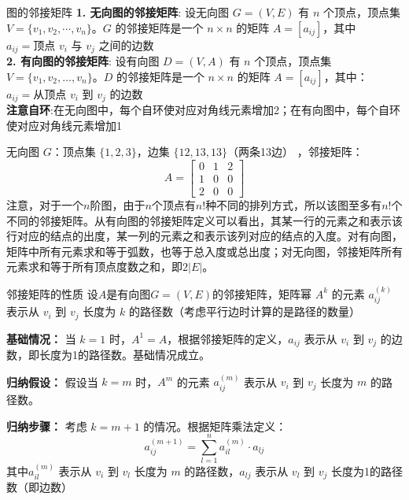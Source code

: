 \documentclass[lang=cn,11pt]{elegantbook}
\begin{document}
\begin{definition}{图的邻接矩阵}
\textbf{1. 无向图的邻接矩阵}:
设无向图 $G = (V, E)$ 有 $n$ 个顶点，顶点集 $V = \{v_1, v_2, \cdots, v_n\}$。$G$ 的邻接矩阵是一个 $n \times n$ 的矩阵 $A = [a_{ij}]$，其中$a_{ij} = \text{顶点 } v_i \text{ 与 } v_j \text{ 之间的边数}$\\
\textbf{2. 有向图的邻接矩阵}:
设有向图 $D = (V, A)$ 有 $n$ 个顶点，顶点集 $V = \{v_1, v_2, \ldots, v_n\}$。$D$ 的邻接矩阵是一个 $n \times n$ 的矩阵 $A = [a_{ij}]$，其中：$a_{ij} = \text{从顶点 } v_i \text{ 到 } v_j \text{ 的边数}$\\
\textbf{注意自环}:在无向图中，每个自环使对应对角线元素增加2；在有向图中，每个自环使对应对角线元素增加1
\end{definition}
无向图 $G$：顶点集 $\{1,2,3\}$，边集 $\{12, 13, 13\}$（两条13边） ，邻接矩阵：\[
A = \begin{bmatrix}
0 & 1 & 2 \\
1 & 0 & 0 \\
2 & 0 & 0
\end{bmatrix}\]
注意，对于一个$n$阶图，由于$n$个顶点有$n!$种不同的排列方式，所以该图至多有$n!$个不同的邻接矩阵。从有向图的邻接矩阵定义可以看出，其某一行的元素之和表示该行对应的结点的出度，某一列的元素之和表示该列对应的结点的入度。对有向图，矩阵中所有元素求和等于弧数，也等于总入度或总出度；对无向图，邻接矩阵所有元素求和等于所有顶点度数之和，即$2|E|$。
\begin{theorem}{邻接矩阵的性质}
设$A$是有向图$G=(V,E)$的邻接矩阵，矩阵幂 $A^k$ 的元素 $a_{ij}^{(k)}$ 表示从 $v_i$ 到 $v_j$ 长度为 $k$ 的路径数（考虑平行边时计算的是路径的数量）
\end{theorem}
\textbf{基础情况：} 当 $k=1$ 时，$A^1 = A$，根据邻接矩阵的定义，$a_{ij}$ 表示从 $v_i$ 到 $v_j$ 的边数，即长度为1的路径数。基础情况成立。

\textbf{归纳假设：} 假设当 $k = m$ 时，$A^m$ 的元素 $a_{ij}^{(m)}$ 表示从 $v_i$ 到 $v_j$ 长度为 $m$ 的路径数。

\textbf{归纳步骤：} 考虑 $k = m+1$ 的情况。根据矩阵乘法定义：
\[
a_{ij}^{(m+1)} = \sum_{l=1}^{n} a_{il}^{(m)} \cdot a_{lj}
\]
其中$a_{il}^{(m)}$ 表示从 $v_i$ 到 $v_l$ 长度为 $m$ 的路径数，$a_{lj}$ 表示从 $v_l$ 到 $v_j$ 长度为1的路径数（即边数）
\end{document}

